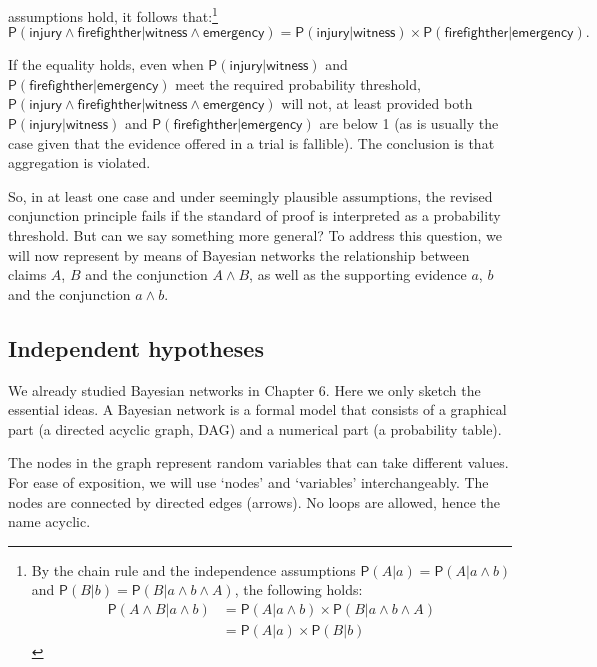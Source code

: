 \documentclass[
  10pt,
  dvipsnames,enabledeprecatedfontcommands]{scrartcl}
\newcommand{\pr}[1]{\ensuremath{\mathsf{P}(#1)}}
\begin{document}
assumptions hold, it follows that:\footnote{By the chain rule and the
  independence assumptions \(\pr{A | a}=\pr{A | a \wedge b}\) and
  \(\pr{B | b}=\pr{B | a \wedge b \wedge A}\), the following holds:
  \begin{align*}
  \pr{A \wedge  B \vert a \wedge b}& =\pr{A \vert a \wedge b} \times \pr{B \vert  a \wedge b \wedge A}\\
   & = \pr{A \vert a} \times \pr{B \vert  b}
   \end{align*}}
\[\pr{\textsf{injury} \wedge \textsf{firefighther} \vert \textsf{witness} \wedge \textsf{emergency}}= \pr{\textsf{injury} \vert \textsf{witness}} \times \pr{\textsf{firefighther} \vert \textsf{emergency}}. \]

\noindent If the equality holds, even when
\(\pr{\textsf{injury} \vert \textsf{witness}}\) and
\(\pr{\textsf{firefighther} \vert \textsf{emergency} }\) meet the
required probability threshold,
\(\pr{\textsf{injury} \wedge \textsf{firefighther} \vert \textsf{witness} \wedge \textsf{emergency}}\)
will not, at least provided both
\(\pr{\textsf{injury} \vert \textsf{witness}}\) and
\(\pr{\textsf{firefighther} \vert \textsf{emergency} }\) are below 1 (as
is usually the case given that the evidence offered in a trial is
fallible). The conclusion is that aggregation is violated.

So, in at least one case and under seemingly plausible assumptions, the
revised conjunction principle fails if the standard of proof is
interpreted as a probability threshold. But can we say something more
general? To address this question, we will now represent by means of
Bayesian networks the relationship between claims \(A\), \(B\) and the
conjunction \(A\wedge B\), as well as the supporting evidence \(a\),
\(b\) and the conjunction \(a\wedge b\).

\hypertarget{independent-hypotheses}{%
\subsection{Independent hypotheses}\label{independent-hypotheses}}

We already studied Bayesian networks in Chapter 6. Here we only sketch
the essential ideas. A Bayesian network is a formal model that consists
of a graphical part (a directed acyclic graph, \textsf{DAG}) and a
numerical part (a probability table).

The nodes in the graph represent random variables that can take
different values. For ease of exposition, we will use `nodes' and
`variables' interchangeably. The nodes are connected by directed edges
(arrows). No loops are allowed, hence the name acyclic.
\end{document}
